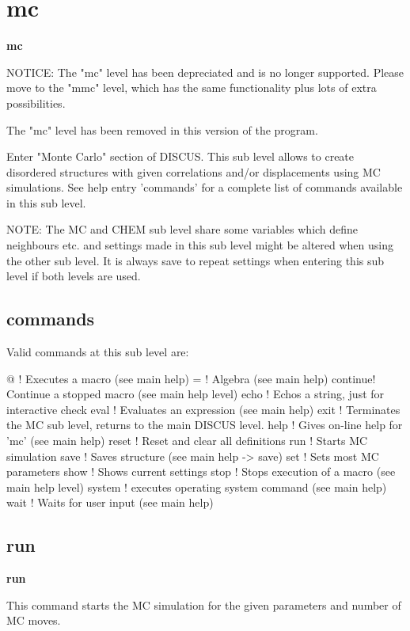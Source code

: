 \section{mc}
{\bf mc \par }
\par
\vspace{3pt}
NOTICE: 
The "mc" level has been depreciated and is no longer supported. 
Please move to the "mmc" level, which has the same functionality 
plus lots of extra possibilities. 
\par
The "mc" level has been removed in this version of the program. 
\par
\par
Enter "Monte Carlo" section of DISCUS. This sub level allows to create 
disordered structures with given correlations and/or displacements 
using MC simulations. See help entry 'commands' for a complete list 
of commands available in this sub level. 
\par
NOTE: The MC and CHEM sub level share some variables which define 
      neighbours etc. and settings made in this sub level might be 
      altered when using the other sub level. It is always save to 
      repeat settings when entering this sub level if both levels 
      are used. 
\par
\subsection*{commands}
Valid commands at this sub level are: 
\par
\begin{MacVerbatim}
@       ! Executes a macro (see main help)
=       ! Algebra (see main help)
continue! Continue a stopped macro (see main help level)
echo    ! Echos a string, just for interactive check
eval    ! Evaluates an expression (see main help)
exit    ! Terminates the MC sub level, returns to the main DISCUS level.
help    ! Gives on-line help for 'mc' (see main help)
reset   ! Reset and clear all definitions
run     ! Starts MC simulation
save    ! Saves structure (see main help -> save)
set     ! Sets most MC parameters
show    ! Shows current settings
stop    ! Stops execution of a macro (see main help level)
system  ! executes operating system command (see main help)
wait    ! Waits for user input (see main help)
\end{MacVerbatim}
\subsection*{run}
{\bf run \par }
\par
\vspace{3pt}
This command starts the MC simulation for the given parameters and 
number of MC moves. 
